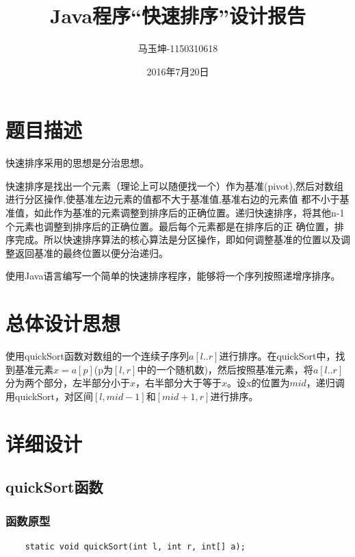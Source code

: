 \documentclass[11pt, a4paper]{article}
\begin{document}
\begin{CJK*}{UTF8}{gbsn}
  \title{\bf Java程序“快速排序”设计报告}
  \author{马玉坤-1150310618}
  \date{2016年7月20日}
  \maketitle
  \renewcommand{\contentsname}{\textbf{目录}}
  \tableofcontents
  \newpage
  \newpage
  
  \section{题目描述}
  
  快速排序采用的思想是分治思想。
  
  快速排序是找出一个元素（理论上可以随便找一个）作为基准(pivot),然后对数组进行分区操作,使基准左边元素的值都不大于基准值,基准右边的元素值 都不小于基准值，如此作为基准的元素调整到排序后的正确位置。递归快速排序，将其他n-1个元素也调整到排序后的正确位置。最后每个元素都是在排序后的正 确位置，排序完成。所以快速排序算法的核心算法是分区操作，即如何调整基准的位置以及调整返回基准的最终位置以便分治递归。

  使用Java语言编写一个简单的快速排序程序，能够将一个序列按照递增序排序。

  \section{总体设计思想}
  
  使用quickSort函数对数组的一个连续子序列$a[l..r]$进行排序。在quickSort中，找到基准元素$x = a[p]$(p为$[l,r]$中的一个随机数)，然后按照基准元素，将$a[l..r]$分为两个部分，左半部分小于$x$，右半部分大于等于$x$。设x的位置为$mid$，递归调用quickSort，对区间$[l,mid-1]$和$[mid+1,r]$进行排序。

  \section{详细设计}

  \subsection{quickSort函数}
  \subsubsection{函数原型}

  \begin{lstlisting}
    static void quickSort(int l, int r, int[] a);
  \end{lstlisting}


\end{CJK*}
\end{document}
